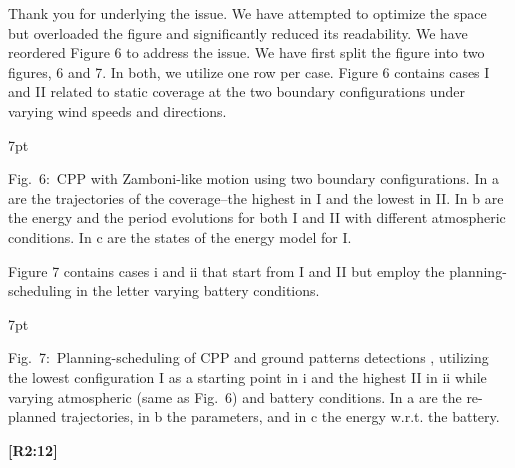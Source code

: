 \documentclass[10pt]{letter}
\newenvironment{formal}{%
  \def\FrameCommand{%
    \hspace{1pt}%
    {\color{red}\vrule width 2pt}%
    {\color{formalshade}\vrule width 4pt}%
    \colorbox{formalshade}%
  }%
  \MakeFramed{\advance\hsize-\width\FrameRestore}%
  \noindent\hspace{-4.55pt}%
  \begin{adjustwidth}{}{7pt}%
  \vspace{2pt}\vspace{2pt}%
}
{%
  \vspace{2pt}\end{adjustwidth}\endMakeFramed%
}
\begin{document}
{\color{blue} 

{\hspace*{-4.5em}{[R2:11]}\vspace*{-1.9em}}

Thank you for underlying the issue. We have attempted to optimize the space but overloaded the figure and significantly reduced its readability. We have reordered Figure 6 to address the issue. We have first split the figure into two figures, 6 and 7. In both, we utilize one row per case. Figure 6 contains cases I and II related to static coverage at the two boundary configurations under varying wind speeds and directions.


\begin{formal}
  \footnotesize
  
  {\color{blue}Fig.~6:~\color{blue}CPP with Zamboni-like motion using two boundary configurations. In {\color{red}a} are the trajectories of the coverage--the highest in {\color{red}I} and the lowest in {\color{red}II}. In {\color{red}b} are the energy and the period evolutions for both {\color{red}I} and {\color{red}II} with different atmospheric conditions. In {\color{red}c} are the states of the energy model for {\color{red}I}.}
\end{formal}

Figure 7 contains cases i and ii that start from I and II but employ the planning-scheduling in the letter varying battery conditions. 

\begin{formal}
  \footnotesize
  
  \vspace*{-.6ex}
  {\color{blue}
  Fig.~7:~Planning-scheduling of CPP and ground patterns detections%
  , utilizing the lowest configuration {\color{red}I} as a starting point in {\color{red}i} and the highest {\color{red}II} in {\color{red}ii} while varying atmospheric (same as Fig.~{\color{red}6}) and battery conditions. In {\color{red}a} are the re-planned trajectories, in {\color{red}b} the parameters, and in {\color{red}c} the energy w.r.t. the battery.}
  \vspace*{1ex}
\end{formal}
}

\vspace*{2em}

{\hspace*{-4.5em}\textbf{[R2:12]}\vspace*{-1.9em}}
\end{document}
